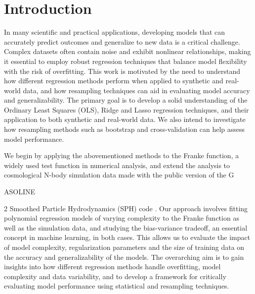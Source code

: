 \documentclass[aps,pra,english,notitlepage,reprint,nofootinbib]{revtex4-1}  %
\begin{document}
\section{Introduction}\label{sec:introduction}
In many scientific and practical applications, developing models that can accurately predict outcomes and generalize to new data is a critical challenge. Complex datasets often contain noise and exhibit nonlinear relationships, making it essential to employ robust regression techniques that balance model flexibility with the risk of overfitting. This work is motivated by the need to understand how different regression methods perform when applied to synthetic and real-world data, and how resampling techniques can aid in evaluating model accuracy and generalizability. The primary goal is to develop a solid understanding of the Ordinary Least Squares (OLS), Ridge and Lasso regression techniques, and their application to both synthetic and real-world data. We also intend to investigate how resampling methods such as bootstrap and cross-validation can help assess model performance.

We begin by applying the abovementioned methods to the Franke function, a widely used test function in numerical analysis, and extend the analysis to cosmological N-body simulation data made with the public version of the G\begin{scriptsize}ASOLINE\end{scriptsize}2 Smoothed Particle Hydrodynamics (SPH) code \cite{gasoline}. Our approach involves fitting polynomial regression models of varying complexity to the Franke function as well as the simulation data, and studying the bias-variance tradeoff, an essential concept in machine learning, in both cases. This allows us to evaluate the impact of model complexity, regularization parameters and the size of training data on the accuracy and generalizability of the models. The overarching aim is to gain insights into how different regression methods handle overfitting, model complexity and data variability, and to develop a framework for critically evaluating model performance using statistical and resampling techniques. 
\end{document}
